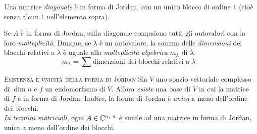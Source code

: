 \begin{observe}
	Una matrice \textit{diagonale} è in forma di Jordan, con un unico blocco di ordine $1$ (cioè senza alcun $1$ nell'elemento sopra).
\end{observe}
\begin{observe}
	Se $A$ è in forma di Jordan, sulla diagonale compaiono tutti gli autovalori con la loro \textit{molteplicità}. Dunque, se $\lambda$ è un autovalore, la somma delle \textit{dimensioni} dei blocchi relativi a $\lambda$ è uguale alla \textit{molteplicità algebrica} $m_\lambda$ di $\lambda$.
	\begin{equation}
		m_\lambda=\sum\text{dimensioni dei blocchi relativi a }\lambda
	\end{equation}
\vspace{-6mm}
\end{observe}
\begin{theorema}\textsc{Esistenza e unicità della forma di Jordan}
	Sia $V$ uno spazio vettoriale complesso di $\dim n$ e $f$ un endomorfismo di $V$. Allora \textit{esiste} una base di $V$ in cui la matrice di $f$ è in forma di Jordan. Inoltre, la forma di Jordan è \textit{unica} a meno dell'ordine dei blocchi.\\
	\textit{In termini matriciali}, ogni $A\in\mathbb{C}^{n,\ n}$ è simile ad una matrice in forma di Jordan, unica a meno dell'ordine dei blocchi.
\end{theorema}
